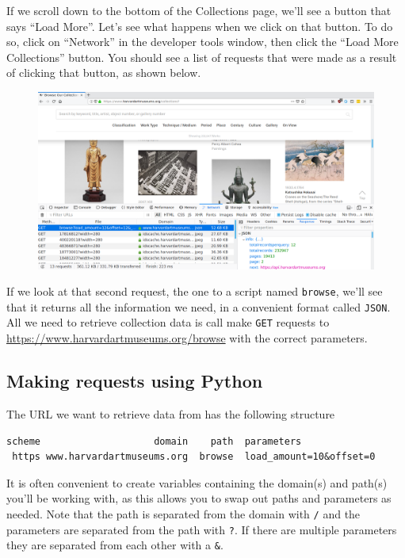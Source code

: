 \documentclass[]{book}
\begin{document}
If we scroll down to the bottom of the Collections page, we'll see a
button that says ``Load More''. Let's see what happens when we click on
that button. To do so, click on ``Network'' in the developer tools
window, then click the ``Load More Collections'' button. You should see
a list of requests that were made as a result of clicking that button,
as shown below.

\begin{figure}
\centering
\includegraphics{Python/PythonWebScrape/images/dev_tools_network.png}
\caption{}
\end{figure}

If we look at that second request, the one to a script named
\texttt{browse}, we'll see that it returns all the information we need,
in a convenient format called \texttt{JSON}. All we need to retrieve
collection data is call make \texttt{GET} requests to
\url{https://www.harvardartmuseums.org/browse} with the correct
parameters.

\subsection{Making requests using
Python}\label{making-requests-using-python}

The URL we want to retrieve data from has the following structure

\begin{verbatim}
scheme                    domain    path  parameters
 https www.harvardartmuseums.org  browse  load_amount=10&offset=0
\end{verbatim}

It is often convenient to create variables containing the domain(s) and
path(s) you'll be working with, as this allows you to swap out paths and
parameters as needed. Note that the path is separated from the domain
with \texttt{/} and the parameters are separated from the path with
\texttt{?}. If there are multiple parameters they are separated from
each other with a \texttt{\&}.
\end{document}
